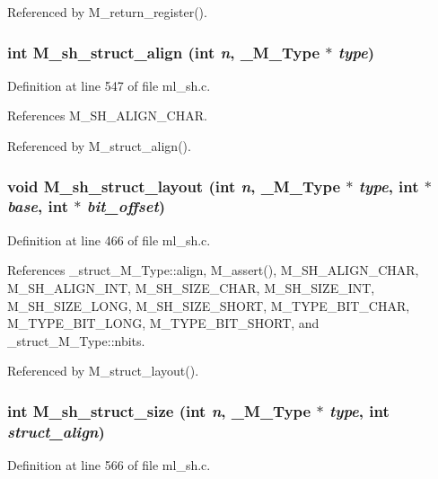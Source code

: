 Referenced by M\_\-return\_\-register().
\subsubsection{\setlength{\rightskip}{0pt plus 5cm}int M\_\-sh\_\-struct\_\-align (int {\em n}, \bf{\_\-M\_\-Type} $\ast$ {\em type})}\label{ml__sh_8c_db0c41a755057f015d9343208a7f877b}




Definition at line 547 of file ml\_\-sh.c.

References M\_\-SH\_\-ALIGN\_\-CHAR.

Referenced by M\_\-struct\_\-align().
\subsubsection{\setlength{\rightskip}{0pt plus 5cm}void M\_\-sh\_\-struct\_\-layout (int {\em n}, \bf{\_\-M\_\-Type} $\ast$ {\em type}, int $\ast$ {\em base}, int $\ast$ {\em bit\_\-offset})}\label{ml__sh_8c_11e8c23a78204ef9d4016643a149a58d}




Definition at line 466 of file ml\_\-sh.c.

References \_\-struct\_\-M\_\-Type::align, M\_\-assert(), M\_\-SH\_\-ALIGN\_\-CHAR, M\_\-SH\_\-ALIGN\_\-INT, M\_\-SH\_\-SIZE\_\-CHAR, M\_\-SH\_\-SIZE\_\-INT, M\_\-SH\_\-SIZE\_\-LONG, M\_\-SH\_\-SIZE\_\-SHORT, M\_\-TYPE\_\-BIT\_\-CHAR, M\_\-TYPE\_\-BIT\_\-LONG, M\_\-TYPE\_\-BIT\_\-SHORT, and \_\-struct\_\-M\_\-Type::nbits.

Referenced by M\_\-struct\_\-layout().
\subsubsection{\setlength{\rightskip}{0pt plus 5cm}int M\_\-sh\_\-struct\_\-size (int {\em n}, \bf{\_\-M\_\-Type} $\ast$ {\em type}, int {\em struct\_\-align})}\label{ml__sh_8c_bc23426ae0714651d0c225d3ad29ebc8}




Definition at line 566 of file ml\_\-sh.c.


